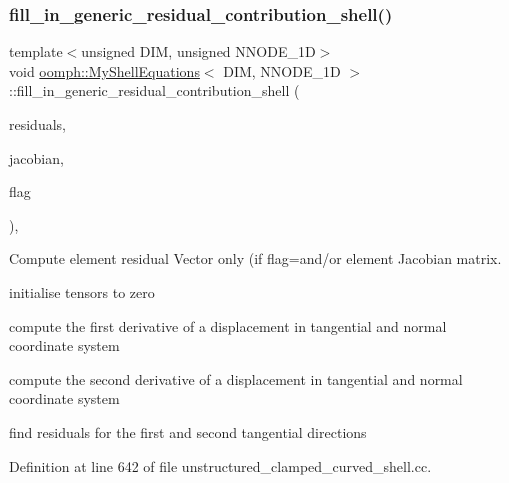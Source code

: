 \subsubsection{\texorpdfstring{fill\+\_\+in\+\_\+generic\+\_\+residual\+\_\+contribution\+\_\+shell()}{fill\_in\_generic\_residual\_contribution\_shell()}}
{\footnotesize\ttfamily template$<$unsigned D\+IM, unsigned N\+N\+O\+D\+E\+\_\+1D$>$ \\
void \hyperlink{classoomph_1_1MyShellEquations}{oomph\+::\+My\+Shell\+Equations}$<$ D\+IM, N\+N\+O\+D\+E\+\_\+1D $>$\+::fill\+\_\+in\+\_\+generic\+\_\+residual\+\_\+contribution\+\_\+shell (\begin{DoxyParamCaption}\item[{Vector$<$ double $>$ \&}]{residuals,  }\item[{Dense\+Matrix$<$ double $>$ \&}]{jacobian,  }\item[{const unsigned \&}]{flag }\end{DoxyParamCaption})\hspace{0.3cm}{\ttfamily [protected]}, {\ttfamily [virtual]}}



Compute element residual Vector only (if flag=and/or element Jacobian matrix. 

initialise tensors to zero

compute the first derivative of a displacement in tangential and normal coordinate system

compute the second derivative of a displacement in tangential and normal coordinate system

find residuals for the first and second tangential directions 

Definition at line 642 of file unstructured\+\_\+clamped\+\_\+curved\+\_\+shell.\+cc.

\mbox{\label{classoomph_1_1MyShellEquations_a6c1858131a4ddd0c59a45449db7e182a}} 
